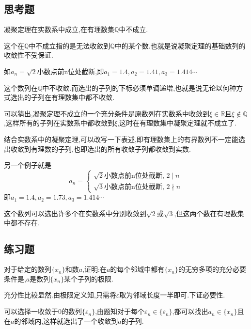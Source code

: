 \documentclass[cn,chinese,fontset]{elegantbook}
\begin{document}
            \subsection{思考题}
            \begin{example}
                凝聚定理在实数系中成立,在有理数集$\mathbb{Q} $中不成立.
            \end{example}
            \begin{solution}
                这个在$\mathbb{Q}$中不成立指的是无法收敛到$\mathbb{Q}$中的某个数.也就是说凝聚定理的基础数列的收敛性不受保证.
                
                如$a_n=\sqrt{2}$小数点前n位处截断,即$a_1=1.4,a_2=1.41,a_3=1.414\cdots$

                这个数列在$\mathbb{Q}$中不收敛.而选出的子列的下标必须单调递增,也就是说无论以何种方式选出的子列在有理数集中都不收敛.

                可以猜出,凝聚定理不成立的一个充分条件是原数列在实数系中收敛到$\xi\in\mathbb{R}$且$\xi\notin\mathbb{Q}$,这样所有的子列在实数系中都收敛到$\xi$,这时在有理数集中凝聚定理就不成立了.

                结合实数系中的凝聚定理,可以改写一下表述,即有理数集上的有界数列不一定能选出收敛到有理数的子列,也即选出的所有收敛子列都收敛到实数.

                另一个例子就是
                \[a_n=\begin{cases}
                    \sqrt{2}\text{小数点前n位处截断},\, 2\mid  n\\
                    \sqrt{3}\text{小数点前n位处截断},\, 2\nmid n
                \end{cases}\]
                即$a_1=1.4,a_2=1.73,a_3=1.414\cdots$

                这个数列可以选出许多个在实数系中分别收敛到$\sqrt{2}$或$\sqrt{3}$,但这两个数在有理数集中都不存在.
            \end{solution}
        \subsection{练习题}
            \begin{exercise}
                对于给定的数列$\{x_n\}$和数$a$,证明:在$a$的每个邻域中都有$\{x_n\}$的无穷多项的充分必要条件是,$a$是数列$\{x_n\}$某个子列的极限.
            \end{exercise}
            \begin{solution}
                充分性比较显然.由极限定义知,只需将$\varepsilon$取为邻域长度一半即可.下证必要性.
                
                可以选择一收敛于0的数列$\{\varepsilon_n\}$,由题知对于每个$\varepsilon_n\in\{\varepsilon_n\}$,都可以找出$a_n\in\{x_n\}$且在$a$的邻域内,这样就选出了一个收敛到$a$的子列.
            \end{solution}
\end{document}
